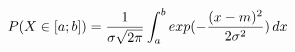 \documentclass[preview]{standalone}
\begin{document}
\begin{align*}
P( X \in [a;b] ) = { \frac{1}{\sigma \sqrt{2\pi}} } \int_a^b { exp(-{ {(x - m)^2} \over {2 \sigma^2} }) } \, dx
\end{align*}
\end{document}
